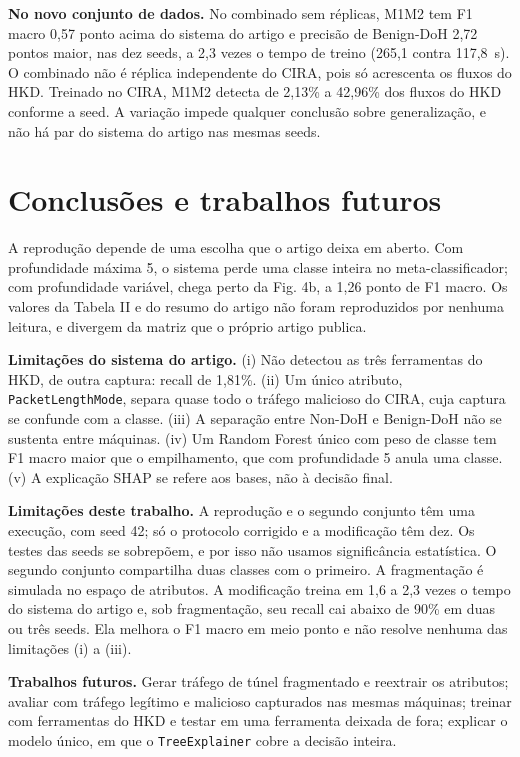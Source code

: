 \documentclass[conference]{IEEEtran}
\begin{document}
\textbf{No novo conjunto de dados.} No combinado sem réplicas, M1M2 tem F1 macro 0,57 ponto acima do sistema do artigo e precisão de Benign-DoH 2,72 pontos maior, nas dez seeds, a 2,3 vezes o tempo de treino (265,1 contra 117,8~s). O combinado não é réplica independente do CIRA, pois só acrescenta os fluxos do HKD. Treinado no CIRA, M1M2 detecta de 2,13\% a 42,96\% dos fluxos do HKD conforme a seed. A variação impede qualquer conclusão sobre generalização, e não há par do sistema do artigo nas mesmas seeds.

\section{Conclusões e trabalhos futuros}

A reprodução depende de uma escolha que o artigo deixa em aberto. Com profundidade máxima 5, o sistema perde uma classe inteira no meta-classificador; com profundidade variável, chega perto da Fig. 4b, a 1,26 ponto de F1 macro. Os valores da Tabela II e do resumo do artigo não foram reproduzidos por nenhuma leitura, e divergem da matriz que o próprio artigo publica.

\textbf{Limitações do sistema do artigo.} (i) Não detectou as três ferramentas do HKD, de outra captura: recall de 1,81\%. (ii) Um único atributo, \texttt{PacketLengthMode}, separa quase todo o tráfego malicioso do CIRA, cuja captura se confunde com a classe. (iii) A separação entre Non-DoH e Benign-DoH não se sustenta entre máquinas. (iv) Um Random Forest único com peso de classe tem F1 macro maior que o empilhamento, que com profundidade 5 anula uma classe. (v) A explicação SHAP se refere aos bases, não à decisão final.

\textbf{Limitações deste trabalho.} A reprodução e o segundo conjunto têm uma execução, com seed 42; só o protocolo corrigido e a modificação têm dez. Os testes das seeds se sobrepõem, e por isso não usamos significância estatística. O segundo conjunto compartilha duas classes com o primeiro. A fragmentação é simulada no espaço de atributos. A modificação treina em 1,6 a 2,3 vezes o tempo do sistema do artigo e, sob fragmentação, seu recall cai abaixo de 90\% em duas ou três seeds. Ela melhora o F1 macro em meio ponto e não resolve nenhuma das limitações (i) a (iii).

\textbf{Trabalhos futuros.} Gerar tráfego de túnel fragmentado e reextrair os atributos; avaliar com tráfego legítimo e malicioso capturados nas mesmas máquinas; treinar com ferramentas do HKD e testar em uma ferramenta deixada de fora; explicar o modelo único, em que o \texttt{TreeExplainer} cobre a decisão inteira.
\end{document}
